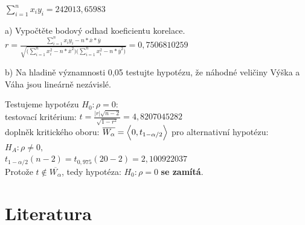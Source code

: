 \documentclass[11pt,a4paper]{article}
\newcommand\ddfrac[2]{\frac{\displaystyle #1}{\displaystyle #2}}
\begin{document}
$ \sum\limits_{i=1}^{n} x_i y_i = 242013,65983 $ \\

\noindent\makebox[\linewidth]{\rule{\textwidth}{0.4pt}}

a) Vypočtěte bodový odhad koeficientu korelace. \\

$ r = \ddfrac{\sum\limits_{i=1}^{n} x_i y_i - n * \overline{x} * \overline{y}}{\sqrt{\biggl( \sum\limits_{i=1}^{n} x_{i}^2 - n * \overline{x}^2 \biggr) \biggl( \sum\limits_{i=1}^n x_{i}^2 - n * \overline{y}^2 \biggr) } }  = 0,7506810259 $ \\

\noindent\makebox[\linewidth]{\rule{\textwidth}{0.4pt}}

b) Na hladině významnosti 0,05 testujte hypotézu, že náhodné veličiny Výška a Váha jsou lineárně
nezávislé.

Testujeme hypotézu $ H_0 : \rho = 0 : $ \\

testovací kritérium: $ t = \ddfrac{|r|\sqrt{n - 2}}{\sqrt{1 - r^2}} = 4,8207045282 $ \\

doplněk kritického oboru: $ \overline{W_\alpha} = \Bigl< 0, t_{1-\alpha/2} \Bigr> $ pro alternativní hypotézu: $ H_A : \rho \ne 0, $ \\

$ t_{1-\alpha/2}(n - 2) = t_{0,975} (20 - 2) = 2,100922037 $ \\

Protože $ t \notin \overline{W_\alpha} $, tedy hypotéza: $ H_0 : \rho = 0 $ \textbf{se zamítá}. \\

\noindent\makebox[\linewidth]{\rule{\textwidth}{0.4pt}}

\newpage
\section{Literatura}

\begin{flushleft}
    
\end{flushleft}
\end{document}
